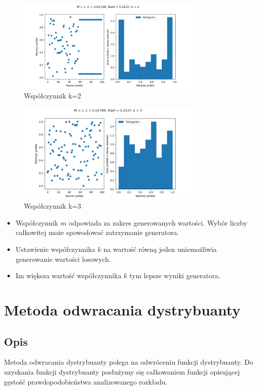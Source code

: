 \documentclass[12pt,a4paper]{article}
\begin{document}
\begin{figure}[H]
  \centering
  \includegraphics[width=0.8\textwidth]{figures/Figure_21.png}
  \caption{Współczynnik k=2}
  \label{fig:14}
\end{figure}

\begin{figure}[H]
  \centering
  \includegraphics[width=0.8\textwidth]{figures/Figure_22.png}
  \caption{Współczynnik k=3}
  \label{fig:14}
\end{figure}


\begin{itemize}
  \item Współczynnik $m$ odpowiada za zakres generowanych wartości. Wybór liczby całkowitej może spowodować zatrzymanie generatora.
  \item Ustawienie współczynnika $k$ na wartość równą jeden uniemożliwia generowanie wartości losowych.
  \item Im większa wartość współczynnika $k$ tym lepsze wyniki generatora.
\end{itemize}

\section{Metoda odwracania dystrybuanty}
  \subsection{Opis}
    Metoda odwracania dystrybuanty polega na odwróceniu funkcji dystrybuanty. Do uzyskania funkcji dystrybuanty posłużymy się całkowaniem funkcji opisującej gęstość prawdopodobieństwa analizowanego rozkładu.
\end{document}
